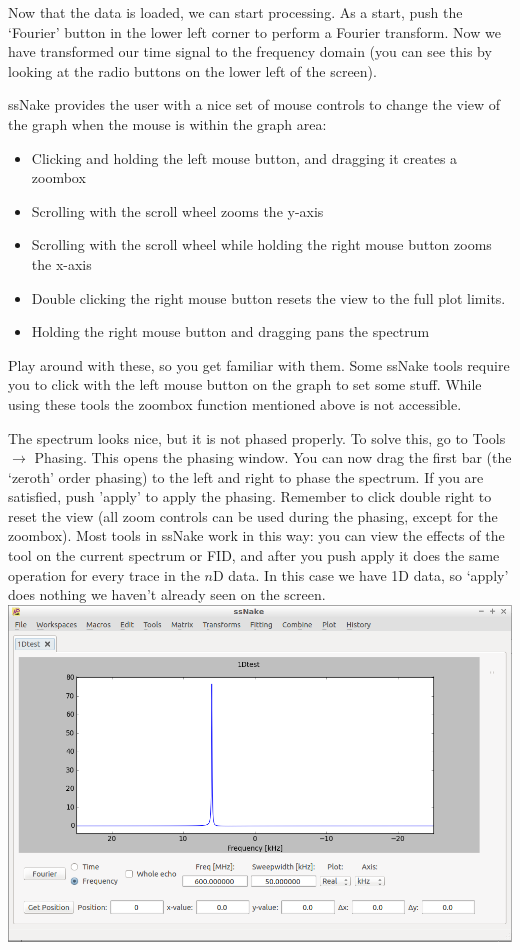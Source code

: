 \documentclass[11pt,a4paper]{article}
\begin{document}
Now that the data is loaded, we can start processing. As a start, push the `Fourier' button in the lower left corner to perform a Fourier transform. Now we have transformed our time signal to the frequency domain (you can see this by looking at the radio buttons on the lower left of the screen). 
\begin{tcolorbox}[breakable,colback=green!5,colframe=MyBlueD,title=\large Mouse button controls,boxrule=2mm,colback=MyBlueD!30!white]
ssNake provides the user with a nice set of mouse controls to change the view of the graph when the mouse is within the graph area:
\begin{itemize}
\item Clicking and holding the left mouse button, and dragging it creates a zoombox
\item Scrolling with the scroll wheel zooms the y-axis
\item Scrolling with the scroll wheel while holding the right mouse button zooms the x-axis
\item Double clicking the right mouse button resets the view to the full plot limits.
\item Holding the right mouse button and dragging pans the spectrum
\end{itemize}
Play around with these, so you get familiar with them. Some ssNake tools require you to click with the left mouse button on the graph to set some stuff. While using these tools the zoombox function mentioned above is not accessible.
\end{tcolorbox}

The spectrum looks nice, but it is not phased properly. To solve this, go to Tools $\rightarrow$ Phasing. This opens the phasing window. You can now drag the first bar (the `zeroth' order phasing) to the left and right to phase the spectrum. If you are satisfied, push 'apply' to apply the phasing. Remember to click double right to reset the view (all zoom controls can be used during the phasing, except for the zoombox). Most tools in ssNake work in this way: you can view the effects of the tool on the current spectrum or FID, and after you push apply it does the same operation for every trace in the $n$D data. In this case we have 1D data, so `apply' does nothing we haven't already seen on the screen. \\
\includegraphics[width=\linewidth]{Images/1DspecPhased.png}
\end{document}
